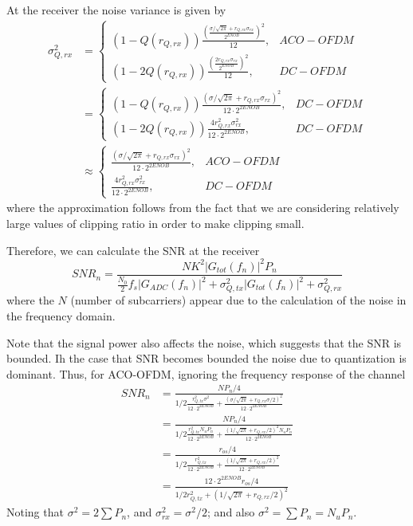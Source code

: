 \documentclass[a4paper]{article}
\begin{document}
At the receiver the noise variance is given by
\begin{align} \nonumber
\sigma^2_{Q,rx} & = \begin{cases}
(1-Q(r_{Q,rx}))\frac{(\frac{\sigma/\sqrt{2\pi} + r_{Q,rx}\sigma_{rx}}{2^{ENOB}})^2}{12}, & ACO-OFDM \\
(1-2Q(r_{Q,rx}))\frac{(\frac{2r_{Q,rx}\sigma_{rx}}{2^{ENOB}})^2}{12}, & DC-OFDM
\end{cases} \\ \nonumber
& = \begin{cases}
(1-Q(r_{Q,rx}))\frac{(\sigma/\sqrt{2\pi} + r_{Q,rx}\sigma_{rx})^2}{12\cdot 2^{2ENOB}}, & DC-OFDM \\
(1-2Q(r_{Q,rx}))\frac{4r_{Q,rx}^2\sigma_{rx}^2}{12\cdot 2^{2ENOB}}, & DC-OFDM
\end{cases} \\
& \approx \begin{cases}
\frac{(\sigma/\sqrt{2\pi} + r_{Q,rx}\sigma_{rx})^2}{12\cdot 2^{2ENOB}}, & ACO-OFDM \\
\frac{4r_{Q,rx}^2\sigma_{rx}^2}{12\cdot 2^{2ENOB}}, & DC-OFDM
\end{cases}
\end{align}
where the approximation follows from the fact that we are considering relatively large values of clipping ratio in order to make clipping small.

Therefore, we can calculate the SNR at the receiver
\begin{equation}
SNR_n = \frac{NK^2|G_{tot}(f_n)|^2P_n}{\frac{N_0}{2}f_s|G_{ADC}(f_n)|^2 + \sigma_{Q,tx}^2|G_{tot}(f_n)|^2 + \sigma_{Q,rx}^2}
\end{equation}
where the $N$ (number of subcarriers) appear due to the calculation of the noise in the frequency domain. 

Note that the signal power also affects the noise, which suggests that the SNR is bounded. Ih the case that SNR becomes bounded the noise due to quantization is dominant. Thus, for ACO-OFDM, ignoring the frequency response of the channel
\begin{align} \nonumber
SNR_n & = \frac{NP_n/4}{1/2\frac{r_{Q,tx}^2\sigma^2}{12\cdot 2^{2ENOB}} + \frac{(\sigma/\sqrt{2\pi} + r_{Q,rx}\sigma/2)^2}{12\cdot 2^{2ENOB}}} \\ \nonumber
& = \frac{NP_n/4}{1/2\frac{r_{Q,tx}^2N_uP_n}{12\cdot 2^{2ENOB}} + \frac{(1/\sqrt{2\pi} + r_{Q,rx}/2)^2N_uP_n}{12\cdot 2^{2ENOB}}} \\ \nonumber
& = \frac{r_{os}/4}{1/2\frac{r_{Q,tx}^2}{12\cdot 2^{2ENOB}} + \frac{(1/\sqrt{2\pi} + r_{Q,rx}/2)^2}{12\cdot 2^{2ENOB}}} \\
& = \frac{12\cdot 2^{2ENOB}r_{os}/4}{1/2r_{Q,tx}^2 + (1/\sqrt{2\pi} + r_{Q,rx}/2)^2}
\end{align}
Noting that $\sigma^2 = 2\sum P_n$, and $\sigma_{rx}^2 = \sigma^2/2$; and also $\sigma^2 = \sum P_n = N_uP_n$.
\end{document}

